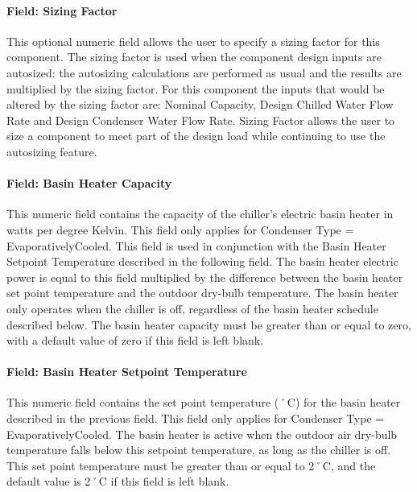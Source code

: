 \paragraph{Field: Sizing Factor}\label{field-sizing-factor-2-000}

This optional numeric field allows the user to specify a sizing factor for this component. The sizing factor is used when the component design inputs are autosized: the autosizing calculations are performed as usual and the results are multiplied by the sizing factor. For this component the inputs that would be altered by the sizing factor are: Nominal Capacity, Design Chilled Water Flow Rate and Design Condenser Water Flow Rate. Sizing Factor allows the user to size a component to meet part of the design load while continuing to use the autosizing feature.

\paragraph{Field: Basin Heater Capacity}\label{field-basin-heater-capacity-002}

This numeric field contains the capacity of the chiller's electric basin heater in watts per degree Kelvin. This field only applies for Condenser Type = EvaporativelyCooled. This field is used in conjunction with the Basin Heater Setpoint Temperature described in the following field. The basin heater electric power is equal to this field multiplied by the difference between the basin heater set point temperature and the outdoor dry-bulb temperature. The basin heater only operates when the chiller is off, regardless of the basin heater schedule described below. The basin heater capacity must be greater than or equal to zero, with a default value of zero if this field is left blank.

\paragraph{Field: Basin Heater Setpoint Temperature}\label{field-basin-heater-setpoint-temperature-002}

This numeric field contains the set point temperature (˚C) for the basin heater described in the previous field. This field only applies for Condenser Type = EvaporativelyCooled. The basin heater is active when the outdoor air dry-bulb temperature falls below this setpoint temperature, as long as the chiller is off. This set point temperature must be greater than or equal to 2˚C, and the default value is 2˚C if this field is left blank.

